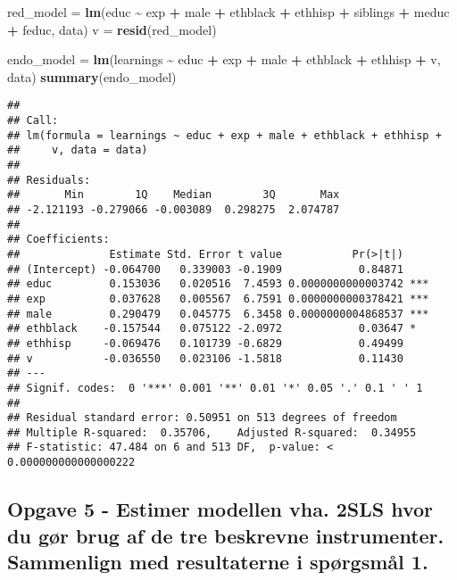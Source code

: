 \documentclass[
]{article}
\newenvironment{Shaded}{\begin{snugshade}}{\end{snugshade}}
\newcommand{\FunctionTok}[1]{\textcolor[rgb]{0.13,0.29,0.53}{\textbf{#1}}}
\newcommand{\NormalTok}[1]{#1}
\newcommand{\OtherTok}[1]{\textcolor[rgb]{0.56,0.35,0.01}{#1}}
\newcommand{\SpecialCharTok}[1]{\textcolor[rgb]{0.81,0.36,0.00}{\textbf{#1}}}
\begin{document}
\begin{Shaded}
\begin{Highlighting}[]
\NormalTok{red\_model }\OtherTok{=} \FunctionTok{lm}\NormalTok{(educ }\SpecialCharTok{\textasciitilde{}}\NormalTok{ exp }\SpecialCharTok{+}\NormalTok{ male }\SpecialCharTok{+}\NormalTok{ ethblack }\SpecialCharTok{+}\NormalTok{ ethhisp }\SpecialCharTok{+}\NormalTok{ siblings }\SpecialCharTok{+}\NormalTok{ meduc }\SpecialCharTok{+}\NormalTok{ feduc, data)}
\NormalTok{v }\OtherTok{=} \FunctionTok{resid}\NormalTok{(red\_model)}

\NormalTok{endo\_model }\OtherTok{=} \FunctionTok{lm}\NormalTok{(learnings }\SpecialCharTok{\textasciitilde{}}\NormalTok{ educ }\SpecialCharTok{+}\NormalTok{ exp }\SpecialCharTok{+}\NormalTok{ male }\SpecialCharTok{+}\NormalTok{ ethblack }\SpecialCharTok{+}\NormalTok{ ethhisp }\SpecialCharTok{+}\NormalTok{ v, data)}
\FunctionTok{summary}\NormalTok{(endo\_model)}
\end{Highlighting}
\end{Shaded}

\begin{verbatim}
## 
## Call:
## lm(formula = learnings ~ educ + exp + male + ethblack + ethhisp + 
##     v, data = data)
## 
## Residuals:
##       Min        1Q    Median        3Q       Max 
## -2.121193 -0.279066 -0.003089  0.298275  2.074787 
## 
## Coefficients:
##              Estimate Std. Error t value           Pr(>|t|)    
## (Intercept) -0.064700   0.339003 -0.1909            0.84871    
## educ         0.153036   0.020516  7.4593 0.0000000000003742 ***
## exp          0.037628   0.005567  6.7591 0.0000000000378421 ***
## male         0.290479   0.045775  6.3458 0.0000000004868537 ***
## ethblack    -0.157544   0.075122 -2.0972            0.03647 *  
## ethhisp     -0.069476   0.101739 -0.6829            0.49499    
## v           -0.036550   0.023106 -1.5818            0.11430    
## ---
## Signif. codes:  0 '***' 0.001 '**' 0.01 '*' 0.05 '.' 0.1 ' ' 1
## 
## Residual standard error: 0.50951 on 513 degrees of freedom
## Multiple R-squared:  0.35706,    Adjusted R-squared:  0.34955 
## F-statistic: 47.484 on 6 and 513 DF,  p-value: < 0.000000000000000222
\end{verbatim}

\hypertarget{opgave-5---estimer-modellen-vha.-2sls-hvor-du-guxf8r-brug-af-de-tre-beskrevne-instrumenter.-sammenlign-med-resultaterne-i-spuxf8rgsmuxe5l-1.}{%
\subsection{Opgave 5 - Estimer modellen vha. 2SLS hvor du gør brug af de
tre beskrevne instrumenter. Sammenlign med resultaterne i spørgsmål
1.}\label{opgave-5---estimer-modellen-vha.-2sls-hvor-du-guxf8r-brug-af-de-tre-beskrevne-instrumenter.-sammenlign-med-resultaterne-i-spuxf8rgsmuxe5l-1.}}
\end{document}
